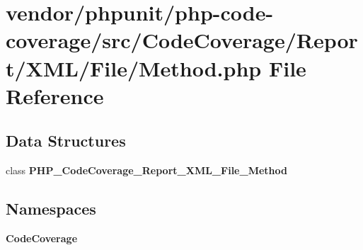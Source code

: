 \section{vendor/phpunit/php-\/code-\/coverage/src/\+Code\+Coverage/\+Report/\+X\+M\+L/\+File/\+Method.php File Reference}
\label{phpunit_2php-code-coverage_2src_2_code_coverage_2_report_2_x_m_l_2_file_2_method_8php}
\subsection*{Data Structures}
\begin{DoxyCompactItemize}
\item 
class {\bf P\+H\+P\+\_\+\+Code\+Coverage\+\_\+\+Report\+\_\+\+X\+M\+L\+\_\+\+File\+\_\+\+Method}
\end{DoxyCompactItemize}
\subsection*{Namespaces}
\begin{DoxyCompactItemize}
\item 
 {\bf Code\+Coverage}
\end{DoxyCompactItemize}
